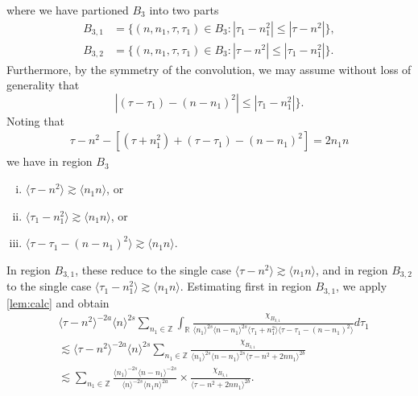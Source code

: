 \documentclass[12pt,reqno]{amsart}
\numberwithin{equation}{section}  %
\numberwithin{figure}{section}
\newcommand{\rr}{\mathbb{R}}
\newcommand{\zz}{\mathbb{Z}}
\theoremstyle{plain}
\theoremstyle{definition}
\theoremstyle{remark}
\begin{document}
%
%
where we have partioned $ B_{3}$ into two parts
\begin{align*}
B_{3,1}&=\{(n, n_1, \tau, \tau_1)\in B_3: |\tau_1-n_1^2|\leq|\tau-n^2|\},\\
B_{3,2}&=\{(n, n_1, \tau, \tau_1)\in B_3: |\tau-n^2|\leq|\tau_1-n_1^2| \}.
\end{align*} 
Furthermore, by the symmetry of the convolution, we may assume without loss of
generality that
$$|(\tau-\tau_1)-(n-n_1)^2|\leq|\tau_1-n_1^2|\}.$$
Noting that 
%
%
\begin{equation*}
\begin{split}
  \tau - n^{2} - \left[ (\tau + n_{1}^{2}) + (\tau - \tau_{1}) - (n -
  n_{1})^{2} \right] = 2n_{1}n
\end{split}
\end{equation*}
%
%
we have in region $B_{3}$ 
%
%
\begin{enumerate}[(i)]
  \item{$\langle \tau - n^{2} \rangle  \gtrsim \langle n_{1}n \rangle$, or}
    \\
  \item{  $\langle \tau_{1} - n_{1}^{2} \rangle  \gtrsim \langle n_{1}n \rangle$, or}
    \\
  \item{ $\langle \tau - \tau_{1} - (n - n_{1})^{2} \rangle  \gtrsim \langle n_{1}n
    \rangle$}.
\end{enumerate}
In region $B_{3,1}$, these reduce to the single case $ \langle \tau - n^{2} \rangle
\gtrsim \langle n_{1}n \rangle$, and in region $B_{3,2}$ to the single
case $ \langle \tau_{1} - n_{1}^{2} \rangle
\gtrsim \langle n_{1}n \rangle$. Estimating first in region
$B_{3,1}$, we apply \autoref{lem:calc} and obtain
%
%
%
%
\begin{equation}
  \label{region-b31}
\begin{split}
& \langle \tau - n^{2}  \rangle ^{-2a} \langle n
    \rangle ^{2s}
    \sum_{n_{1} \in \zz} \int_{\rr} \frac{\chi_{B_{3,1}}}{ \langle n_{1} \rangle ^{2s} \langle n-n_{1} \rangle ^{2s} 
\langle \tau_{1} + n_{1}^{2}  \rangle \langle  \tau - \tau_{1} - (n -
n_{1})^{2}  \rangle}
d \tau_1 
\\
& \lesssim \langle \tau - n^{2} \rangle ^{-2a} \langle n \rangle ^{2s}
\sum_{n_{1} \in
\zz}  \frac{\chi_{B_{3,1}}}{\langle n_{1} \rangle ^{2s} \langle n - n_{1} \rangle
^{2s} \langle \tau - n^{2} + 2nn_{1}  \rangle ^{2b}}
\\
& \lesssim 
\sum_{n_{1} \in
\zz}  \frac{\langle n_1 \rangle ^{-2s} \langle n - n_{1} \rangle ^{-2s}}{\langle
n \rangle ^{-2s} \langle n_{1}n \rangle
^{2a}} \times \frac{\chi_{B_{3,1}}}{\langle \tau - n^{2} + 2nn_{1}
\rangle ^{2b}}.
\end{split}
\end{equation}
\end{document}
